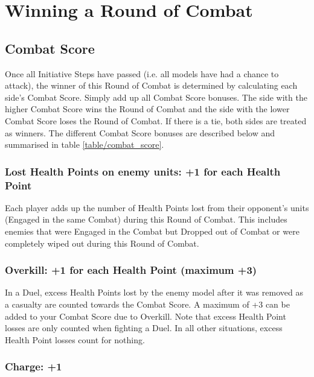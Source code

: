 \newpage
\section{Winning a Round of Combat}
\label{winning_a_round_of_combat}

\subsection{Combat Score}
\label{combat_score}

Once all Initiative Steps have passed (i.e. all models have had a chance to attack), the winner of this Round of Combat is determined by calculating each side's Combat Score. Simply add up all Combat Score bonuses. The side with the higher Combat Score wins the Round of Combat and the side with the lower Combat Score loses the Round of Combat. If there is a tie, both sides are treated as winners. The different Combat Score bonuses are described below and summarised in table \ref{table/combat_score}.

\subsubsection{Lost Health Points on enemy units: +1 for each Health Point}

Each player adds up the number of Health Points lost from their opponent's units (Engaged in the same Combat) during this Round of Combat. This includes enemies that were Engaged in the Combat but Dropped out of Combat or were completely wiped out during this Round of Combat.

\subsubsection{Overkill: +1 for each Health Point (maximum +3)}

In a Duel, excess Health Points lost by the enemy model after it was removed as a casualty are counted towards the Combat Score. A maximum of +3 can be added to your Combat Score due to Overkill. Note that excess  Health Point losses are only counted when fighting a Duel. In all other situations, excess Health Point losses count for nothing.

\subsubsection{Charge: +1}

